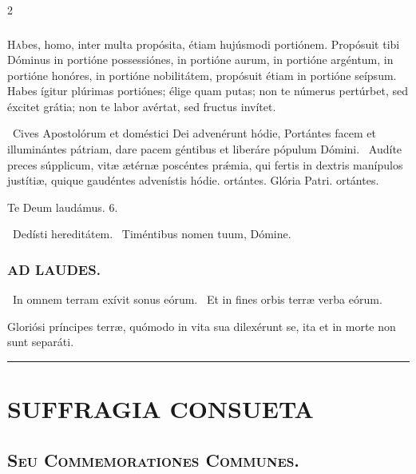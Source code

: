 \documentclass[9pt,twoside]{extarticle}
\begin{document}
\begin{multicols}{2}
{\subsubsection*{\center {}}
\lettrine{H}abes, homo, inter multa propósita, étiam hujúsmodi portiónem. Propósuit tibi Dóminus in portióne possessiónes, in portióne aurum, in portióne argéntum, in portióne honóres, in portióne nobilitátem, propósuit étiam in portióne seípsum. Habes ígitur plúrimas portiónes; élige quam putas; non te númerus pertúrbet, sed éxcitet grátia; non te labor avértat, sed fructus invítet.

\begin{tightlist}{}
\item {}~Cives Apostolórum et doméstici Dei advenérunt hódie, \textred{*} Portántes facem et illuminántes pátriam, dare pacem géntibus et liberáre pópulum Dómini. ~Audíte preces súpplicum, vitæ ætérnæ poscéntes prǽmia, qui fertis in dextris manípulos justítiæ, quique gaudéntes advenístis hódie. ortántes. Glória Patri. ortántes.
\item Te Deum laudámus. 6.
\item {}~Dedísti hereditátem. ~Timéntibus nomen tuum, Dómine.
\end{tightlist}

\subsubsection*{\center \textsc{AD LAUDES.}}
\begin{tightlist}{}
\item {}~In omnem terram exívit sonus eórum. ~Et in fines orbis terræ verba eórum.
\item {} Gloriósi príncipes terræ, quómodo in vita sua dilexérunt se, ita et in morte non sunt separáti.
\end{tightlist}

\begin{center}\textcolor{red}{\rule{\linewidth}{0.5pt}} \end{center}
\clearpage
\section*{\center \textsc{SUFFRAGIA CONSUETA}}
\subsection*{\center \textsc{Seu Commemorationes Communes.}}

}
\end{multicols}
\end{document}
